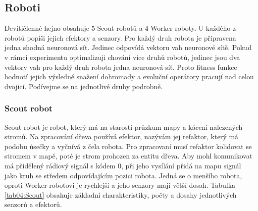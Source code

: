 \subsection*{Roboti}
Devítičlenné hejno obsahuje 5 Scout robotů a 4 Worker roboty. U každého z robotů popíši jejich efektory a senzory. Pro každý druh robota je připravena jedna shodná neuronová sít. Jedinec odpovídá vektoru vah neuronové sítě. Pokud v rámci experimentu optimalizuji chování více druhů robotů, jedinec jsou dva vektory vah pro každý druh robota jedna neuronová síť. Proto fitness funkce hodnotí jejich výsledné snažení dohromady a evoluční operátory pracují nad celou dvojicí. Podívejme se na jednotlivé druhy podrobně.
\subsubsection{Scout robot}
Scout robot je robot, který má na starosti průzkum mapy a kácení nalezených stromů. Na zpracování dřeva používá efektor, nazývám jej refaktor, který má podobu úsečky a vyčnívá z čela robota. Pro zpracovaní musí refaktor kolidovat se stromem v mapě, poté je strom prohozen za entitu dřeva. Aby mohl komunikovat má přidělený rádiový signál s kódem 0, při jeho vysílání přidá na mapu signál jako kruh se středem odpovídajícím pozici robota. Jedná se o menšího robota, oproti Worker robotovi je rychlejší a jeho senzory mají větší dosah. Tabulka \ref{tab04:Scout} obsahuje základní charakteristiky, počty a dosahy jednotlivých senzorů a efektorů.
\par 
